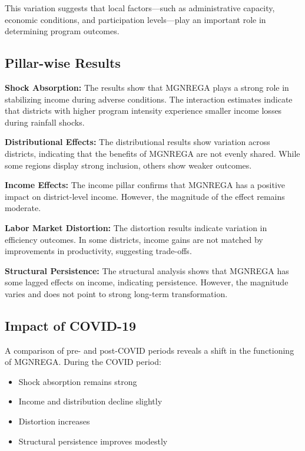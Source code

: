 \documentclass[12pt]{article}
\begin{document}
This variation suggests that local factors—such as administrative capacity, economic conditions, and participation levels—play an important role in determining program outcomes.

\subsection{Pillar-wise Results}

\textbf{Shock Absorption:}
The results show that MGNREGA plays a strong role in stabilizing income during adverse conditions. The interaction estimates indicate that districts with higher program intensity experience smaller income losses during rainfall shocks.

\textbf{Distributional Effects:}
The distributional results show variation across districts, indicating that the benefits of MGNREGA are not evenly shared. While some regions display strong inclusion, others show weaker outcomes.

\textbf{Income Effects:}
The income pillar confirms that MGNREGA has a positive impact on district-level income. However, the magnitude of the effect remains moderate.

\textbf{Labor Market Distortion:}
The distortion results indicate variation in efficiency outcomes. In some districts, income gains are not matched by improvements in productivity, suggesting trade-offs.

\textbf{Structural Persistence:}
The structural analysis shows that MGNREGA has some lagged effects on income, indicating persistence. However, the magnitude varies and does not point to strong long-term transformation.

\subsection{Impact of COVID-19}

A comparison of pre- and post-COVID periods reveals a shift in the functioning of MGNREGA. During the COVID period:

\begin{itemize}
\item Shock absorption remains strong
\item Income and distribution decline slightly
\item Distortion increases
\item Structural persistence improves modestly
\end{itemize}
\end{document}
